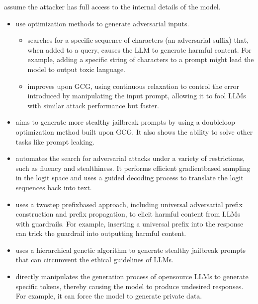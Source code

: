 \documentclass[letterpaper,11pt,english]{sphinxmanual}
\begin{document}
\sphinxAtStartPar
{} assume the attacker has full access to the
internal details of the model.
\begin{itemize}
\item {} 
\sphinxAtStartPar
{} use optimization methods to generate
adversarial inputs.
\begin{itemize}
\item {} 
\sphinxAtStartPar
{} searches for a specific sequence
of characters (an adversarial suffix) that, when added to a query,
causes the LLM to generate harmful content. For example, adding a
specific string of characters to a prompt might lead the model to
output toxic language.

\item {} 
\sphinxAtStartPar
{} improves upon GCG, using
continuous relaxation to control the error introduced by
manipulating the input prompt, allowing it to fool LLMs with similar
attack performance but faster.

\end{itemize}

\item {} 
\sphinxAtStartPar
{} aims to generate more stealthy jailbreak prompts by
using a double\sphinxhyphen{}loop optimization method built upon GCG. It also shows
the ability to solve other tasks like prompt leaking.

\item {} 
\sphinxAtStartPar
{} automates the search for adversarial attacks under a
variety of restrictions, such as fluency and stealthiness. It performs
efficient gradient\sphinxhyphen{}based sampling in the logit space and uses a guided
decoding process to translate the logit sequences back into text.

\item {} 
\sphinxAtStartPar
{} uses a two\sphinxhyphen{}step prefix\sphinxhyphen{}based approach,
including universal adversarial prefix construction and prefix
propagation, to elicit harmful content from LLMs with guardrails. For
example, inserting a universal prefix into the response can trick the
guardrail into outputting harmful content.

\item {} 
\sphinxAtStartPar
{} uses a hierarchical genetic algorithm to generate
stealthy jailbreak prompts that can circumvent the ethical guidelines
of LLMs.

\item {} 
\sphinxAtStartPar
{} directly manipulates the generation
process of open\sphinxhyphen{}source LLMs to generate specific tokens, thereby
causing the model to produce undesired responses. For example, it can
force the model to generate private data.

\end{itemize}
\end{document}

